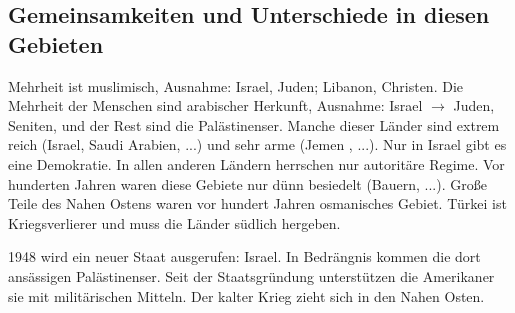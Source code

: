 \documentclass[a4paper,final]{report}
\begin{document}
\subsection{Gemeinsamkeiten und Unterschiede in diesen Gebieten}

Mehrheit ist muslimisch, Ausnahme: Israel, Juden; Libanon, Christen. Die Mehrheit der Menschen sind arabischer Herkunft, Ausnahme: Israel $\rightarrow$ Juden, Seniten, und der Rest sind die Palästinenser. Manche dieser Länder sind extrem reich (Israel, Saudi Arabien, ...) und sehr arme (Jemen , ...). Nur in Israel gibt es eine Demokratie. In allen anderen  Ländern herrschen nur autoritäre Regime. Vor hunderten Jahren waren diese Gebiete nur dünn besiedelt (Bauern, ...). Große Teile des Nahen Ostens waren vor hundert Jahren osmanisches Gebiet. Türkei ist Kriegsverlierer und muss die Länder südlich hergeben.

1948 wird ein neuer Staat ausgerufen: Israel. In Bedrängnis kommen die dort ansässigen Palästinenser. 
Seit der Staatsgründung unterstützen die Amerikaner sie mit militärischen Mitteln. Der kalter Krieg zieht sich in den Nahen Osten.
\end{document}
